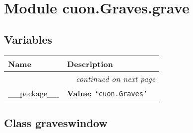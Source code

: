 %
%
%


\section{Module cuon.Graves.grave}

    \label{cuon:Graves:grave}


  \subsection{Variables}

    \vspace{-1cm}
\hspace{\varindent}\begin{longtable}{|p{\varnamewidth}|p{\vardescrwidth}|l}
\cline{1-2}
\cline{1-2} \centering \textbf{Name} & \centering \textbf{Description}& \\
\cline{1-2}
\endhead\cline{1-2}\multicolumn{3}{r}{\small\textit{continued on next page}}\\\endfoot\cline{1-2}
\endlastfoot\raggedright \_\-\_\-p\-a\-c\-k\-a\-g\-e\-\_\-\_\- & \raggedright \textbf{Value:} 
{\tt \texttt{'}\texttt{cuon.Graves}\texttt{'}}&\\
\cline{1-2}
\end{longtable}



\subsection{Class graveswindow}


